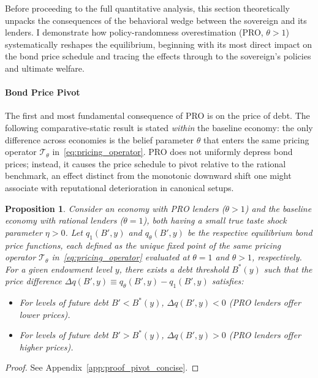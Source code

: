\documentclass[12pt]{article}
\theoremstyle{plain}
\newtheorem{proposition}{Proposition}
\begin{document}
Before proceeding to the full quantitative analysis, this section theoretically
unpacks the consequences of the behavioral wedge between the sovereign and its
lenders. I demonstrate how policy-randomness overestimation (PRO, $\theta > 1$)
systematically reshapes the equilibrium, beginning with its most direct impact
on the bond price schedule and tracing the effects through to the sovereign's
policies and ultimate welfare.

\paragraph{Bond Price Pivot}The first and most fundamental consequence of PRO is on the price of debt. The
following comparative-static result is stated \emph{within} the baseline
economy: the only difference across economies is the belief parameter $\theta$
that enters the same pricing operator $\mathcal T_\theta$
in~\eqref{eq:pricing_operator}. PRO does not uniformly depress bond prices;
instead, it causes the price schedule to pivot relative to the rational
benchmark, an effect distinct from the monotonic downward shift one might
associate with reputational deterioration in canonical setups.

\begin{proposition}\label{prop:pivot_concise}
	Consider an economy with PRO lenders ($\theta > 1$) and the baseline economy with rational lenders ($\theta = 1$), both having a small true taste shock parameter $\eta > 0$. Let $q_1(B', y)$ and $q_\theta(B', y)$ be the respective equilibrium bond price functions, each defined as the unique fixed point of the \emph{same} pricing operator $\mathcal T_\theta$ in~\eqref{eq:pricing_operator} evaluated at $\theta=1$ and $\theta>1$, respectively. For a given endowment level $y$, there exists a debt threshold $B^*(y)$ such that the price difference $\Delta q(B', y) \equiv q_\theta(B', y) - q_1(B', y)$ satisfies:
	\begin{itemize}
		\item For levels of future debt $B' < B^*(y)$, $\Delta q(B', y) < 0$ (PRO lenders
		      offer lower prices).
		\item For levels of future debt $B' > B^*(y)$, $\Delta q(B', y) > 0$ (PRO lenders
		      offer higher prices).
	\end{itemize}
\end{proposition}

\begin{proof}
	See Appendix~\ref{app:proof_pivot_concise}.
\end{proof}
\end{document}

